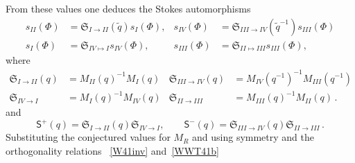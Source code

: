 \documentclass[12pt,reqno]{amsart}
\theoremstyle{definition}
\def\tq{\tilde{q}}
\def\sss#1{$\clubsuit\clubsuit$ \textcolor[rgb]{0.0,0.5,0.0}
  {SG: \emph{#1}}$\clubsuit\clubsuit$}
\def\mf{\mathfrak}
\def\ms{\mathsf}
\newcommand{\nn}{\nonumber \\}
\begin{document}
%
From these values one deduces the Stokes automorphisms
%
\begin{align}
  s_{II}(\Phi)&= \mathfrak{S}_{I \rightarrow II}(\tq)s_{I}(\Phi),
  & s_{IV}(\Phi)&= \mathfrak{S}_{III \rightarrow IV}(\tq^{-1})s_{III}(\Phi)\nn
s_{I}(\Phi) &= \mf{S}_{IV\mapsto I} s_{IV}(\Phi), &
s_{III}(\Phi) &= \mf{S}_{II\mapsto III} s_{III}(\Phi),
\end{align}
%
where
\begin{subequations}
  \begin{align}
  \label{Spm3}
    \mathfrak{S}_{I \rightarrow II}(q)
    &= M_{II}(q)^{-1} M_I(q)
    & \mathfrak{S}_{III \rightarrow IV}(q)
    &= M_{IV}(q^{-1})^{-1}
  M_{III}(q^{-1}) \\
  \label{Spm4}
    \mathfrak{S}_{IV\rightarrow I}
    & = M_I(q)^{-1}M_{IV}(q)
    & \mathfrak{S}_{II\rightarrow III}
    &= M_{III}(q)^{-1}M_{II}(q) \,.
\end{align}
\end{subequations}
and
\begin{equation}
  \label{Spm1}
  \ms{S}^+(q)= 
  \mathfrak{S}_{I \rightarrow II}(q)
  \mathfrak{S}_{IV\rightarrow I}, \qquad
  \ms{S}^-(q)= 
  \mathfrak{S}_{III \rightarrow IV}(q)
  \mathfrak{S}_{II\rightarrow III}\,.
\end{equation}
Substituting the conjectured values for $M_R$
and using symmetry and the orthogonality relations
~\eqref{W41inv} and~\eqref{WWT41b} 
\end{document}
